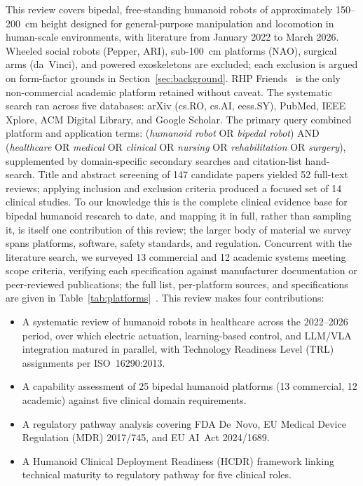 \documentclass[acmsmall]{acmart}
\begin{document}
This review covers bipedal, free-standing humanoid robots of approximately
150--200~cm height designed for general-purpose manipulation and locomotion in
human-scale environments, with literature from January 2022 to March 2026.
Wheeled social robots (Pepper, ARI), sub-100~cm platforms (NAO), surgical arms
(da~Vinci), and powered exoskeletons are excluded; each exclusion is argued on
form-factor grounds in Section~\ref{sec:background}. RHP
Friends~\cite{benallegue2025rhp} is the only non-commercial academic platform
retained without caveat. The systematic search ran across five databases: arXiv
(cs.RO, cs.AI, eess.SY), PubMed, IEEE Xplore, ACM Digital Library, and Google
Scholar. The primary query combined platform and application terms:
(\emph{humanoid robot} OR \emph{bipedal robot}) AND (\emph{healthcare} OR
\emph{medical} OR \emph{clinical} OR \emph{nursing} OR \emph{rehabilitation} OR
\emph{surgery}), supplemented by domain-specific secondary searches and
citation-list hand-search. Title and abstract screening of 147 candidate papers
yielded 52 full-text reviews; applying inclusion and exclusion criteria produced
a focused set of 14 clinical studies. To our knowledge this is the complete
clinical evidence base for bipedal humanoid research to date, and mapping it in
full, rather than sampling it, is itself one contribution of this review; the
larger body of material we survey spans platforms, software, safety standards,
and regulation.
Concurrent with the literature search, we surveyed 13
commercial and 12 academic systems meeting scope criteria, verifying each
specification against manufacturer documentation or peer-reviewed publications;
the full list, per-platform sources, and specifications are given in
Table~\ref{tab:platforms}~\cite{figureai2024unveils,unitree2024g1,bostondynamics2024atlas,apptronik2023apollo,sanctuaryai2023phoenix,dafarra2024icub3}. This review makes four contributions:


\begin{itemize}
\item A systematic review of humanoid robots in healthcare across the 2022--2026
  period, over which electric actuation, learning-based control, and LLM/VLA
  integration matured in parallel, with Technology Readiness Level (TRL)
  assignments per ISO~16290:2013.
\item A capability assessment of 25 bipedal humanoid platforms (13 commercial,
  12 academic) against five clinical domain requirements.
\item A regulatory pathway analysis covering FDA De~Novo, EU Medical Device
  Regulation (MDR) 2017/745, and EU AI~Act 2024/1689.
\item A Humanoid Clinical Deployment Readiness (HCDR) framework linking technical
  maturity to regulatory pathway for five clinical roles.
\end{itemize}
\end{document}
